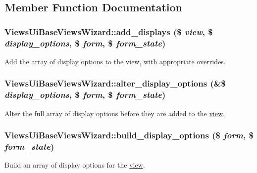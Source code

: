\subsection{Member Function Documentation}
\hypertarget{classViewsUiBaseViewsWizard_a8d817fb64a28ebd753b40b0af96c19f4}{
\subsubsection[{add\_\-displays}]{\setlength{\rightskip}{0pt plus 5cm}ViewsUiBaseViewsWizard::add\_\-displays (\$ {\em view}, \/  \$ {\em display\_\-options}, \/  \$ {\em form}, \/  \$ {\em form\_\-state})}}
\label{classViewsUiBaseViewsWizard_a8d817fb64a28ebd753b40b0af96c19f4}
Add the array of display options to the \hyperlink{classview}{view}, with appropriate overrides. \hypertarget{classViewsUiBaseViewsWizard_ab27a3f84ed71dca5754bc53254f079f8}{
\subsubsection[{alter\_\-display\_\-options}]{\setlength{\rightskip}{0pt plus 5cm}ViewsUiBaseViewsWizard::alter\_\-display\_\-options (\&\$ {\em display\_\-options}, \/  \$ {\em form}, \/  \$ {\em form\_\-state})}}
\label{classViewsUiBaseViewsWizard_ab27a3f84ed71dca5754bc53254f079f8}
Alter the full array of display options before they are added to the \hyperlink{classview}{view}. \hypertarget{classViewsUiBaseViewsWizard_a7a12effa5cd30673c45c00c4c21ee5dc}{
\subsubsection[{build\_\-display\_\-options}]{\setlength{\rightskip}{0pt plus 5cm}ViewsUiBaseViewsWizard::build\_\-display\_\-options (\$ {\em form}, \/  \$ {\em form\_\-state})}}
\label{classViewsUiBaseViewsWizard_a7a12effa5cd30673c45c00c4c21ee5dc}
Build an array of display options for the \hyperlink{classview}{view}.

